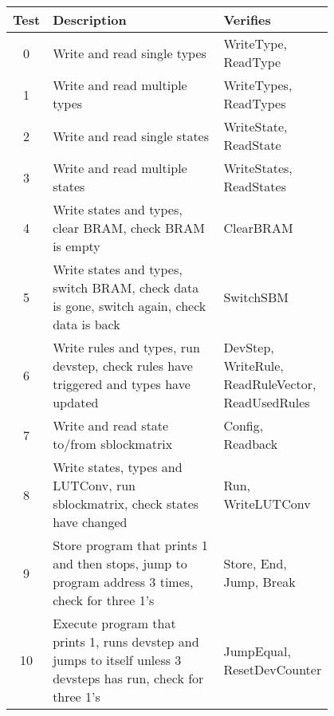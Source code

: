 \begin{table}[!ht]
    \renewcommand{\arraystretch}{1.3}
    \centering
    \begin{tabular}{c|p{0.55\linewidth}|p{0.25\linewidth}}
        \bfseries Test & \bfseries Description & \bfseries Verifies \\
        \hline
        0 & Write and read single types & WriteType, ReadType \\
        1 & Write and read multiple types & WriteTypes, ReadTypes \\
        2 & Write and read single states & WriteState, ReadState \\
        3 & Write and read multiple states & WriteStates, ReadStates \\
        4 & Write states and types, clear BRAM, check BRAM is empty & ClearBRAM \\
        5 & Write states and types, switch BRAM, check data is gone, switch again, check data is back & SwitchSBM \\
        6 & Write rules and types, run devstep, check rules have triggered and types have updated & DevStep, WriteRule, ReadRuleVector, ReadUsedRules \\
        7 & Write and read state to/from sblockmatrix & Config, Readback \\
        8 & Write states, types and LUTConv, run sblockmatrix, check states have changed & Run, WriteLUTConv \\
        9 & Store program that prints 1 and then stops, jump to program address 3 times, check for three 1's & Store, End, Jump, Break \\
        10 & Execute program that prints 1, runs devstep and jumps to itself unless 3 devsteps has run, check for three 1's & JumpEqual, ResetDevCounter \\
    \end{tabular}
\end{table}

